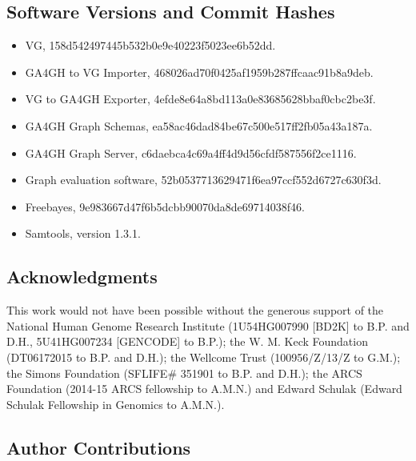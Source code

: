 \subsection{Software Versions and Commit Hashes}

\begin{itemize}
\item[] VG, 158d542497445b532b0e9e40223f5023ee6b52dd.

\item[] GA4GH to VG Importer, 468026ad70f0425af1959b287ffcaac91b8a9deb.

\item[] VG to GA4GH Exporter, 4efde8e64a8bd113a0e83685628bbaf0cbc2be3f.

\item[] GA4GH Graph Schemas, ea58ac46dad84be67c500e517ff2fb05a43a187a.

\item[] GA4GH Graph Server, c6daebca4c69a4ff4d9d56cfdf587556f2ce1116.

\item[] Graph evaluation software, 52b0537713629471f6ea97ccf552d6727c630f3d.

\item[] Freebayes, 9e983667d47f6b5dcbb90070da8de69714038f46.

\item[] Samtools, version 1.3.1.
\end{itemize}

\subsection{Acknowledgments}

This work would not have been possible without the generous support of
the National Human Genome Research Institute (1U54HG007990 {[}BD2K{]} to
B.P. and D.H., 5U41HG007234 {[}GENCODE{]} to B.P.); the W. M. Keck
Foundation (DT06172015 to B.P. and D.H.); the Wellcome Trust
(100956/Z/13/Z to G.M.); the Simons Foundation (SFLIFE\# 351901 to B.P.
and D.H.); the ARCS Foundation (2014-15 ARCS fellowship to A.M.N.) and
Edward Schulak (Edward Schulak Fellowship in Genomics to A.M.N.).

\subsection{Author Contributions}

